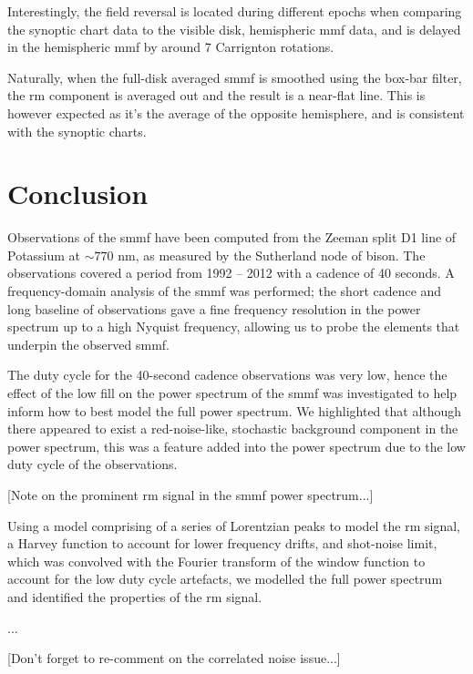 Interestingly, the field reversal is located during different epochs when comparing the synoptic chart data to the visible disk, hemispheric \gls{mmf} data, and is delayed in the hemispheric \gls{mmf} by around 7 Carrignton rotations.

Naturally, when the full-disk averaged \gls{smmf} is smoothed using the box-bar filter, the \gls{rm} component is averaged out and the result is a near-flat line. This is however expected as it's the average of the opposite hemisphere, and is consistent with the synoptic charts.


\section{Conclusion}\label{sec:SMMF_conclusion}


Observations of the \gls{smmf} have been computed from the Zeeman split D1 line of Potassium at $\sim 770$ nm, as measured by the Sutherland node of \gls{bison}. The observations covered a period from 1992 -- 2012 with a cadence of 40 seconds. A frequency-domain analysis of the \gls{smmf} was performed; the short cadence and long baseline of observations gave a fine frequency resolution in the power spectrum up to a high Nyquist frequency, allowing us to probe the elements that underpin the observed \gls{smmf}.

The duty cycle for the 40-second cadence observations was very low, hence the effect of the low fill on the power spectrum of the \gls{smmf} was investigated to help inform how to best model the full power spectrum. We highlighted that although there appeared to exist a red-noise-like, stochastic background component in the power spectrum, this was a feature added into the power spectrum due to the low duty cycle of the observations.

[Note on the prominent \gls{rm} signal in the \gls{smmf} power spectrum...]

Using a model comprising of a series of Lorentzian peaks to model the \gls{rm} signal, a Harvey function to account for lower frequency drifts, and shot-noise limit, which was convolved with the Fourier transform of the window function to account for the low duty cycle artefacts, we modelled the full power spectrum and identified the properties of the \gls{rm} signal.

...

[Don't forget to re-comment on the correlated noise issue...]

